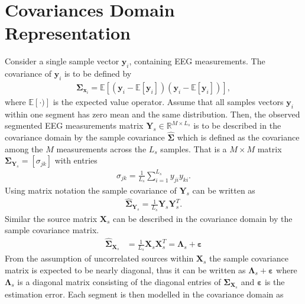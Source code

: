 \section{Covariances Domain Representation}\label{sec:cov}
Consider a single sample vector $\textbf{y}_i$, containing EEG measurements. 
The covariance of $\textbf{y}_i$ is to be defined by
\begin{align*}
\boldsymbol{\Sigma}_{\textbf{x}_i}=\mathbb{E}[(\textbf{y}_i-\mathbb{E}[\textbf{y}_i])(\textbf{y}_i-\mathbb{E}[\textbf{y}_i])],
\end{align*}
where $\mathbb{E}[\cdot)]$ is the expected value operator. 
Assume that all samples vectors $\textbf{y}_i$ within one segment has zero mean and the same distribution. 
Then, the observed segmented EEG measurements matrix $\mathbf{Y}_s \in \mathbb{R}^{M \times L_s}$ is to be described in the covariance domain by the sample covariance $\widehat{\boldsymbol{\Sigma}}$ which is defined as the covariance among the $M$ measurements across the $L_s$ samples. That is a $M \times M$ matrix $\boldsymbol{\Sigma}_{\mathbf{Y}_s}=[\sigma_{jk}]$ with entries 
\begin{align*}
\sigma_{jk}= \frac{1}{L_s}\sum_{i=1}^{L_s} y_{ji} y_{ki}.
\end{align*}
Using matrix notation the sample covariance of $\mathbf{Y}_s$ can be written as
\begin{align*}
\widehat{\boldsymbol{\Sigma}}_{\mathbf{Y}_s} = \frac{1}{L_s} \mathbf{Y}_s \mathbf{Y}_s^T.
\end{align*}  
Similar the source matrix $\mathbf{X}_s$ can be described in the covariance domain by the sample covariance matrix.
\begin{align*}
\widehat{\boldsymbol{\Sigma}}_{\mathbf{X}_s} &= \frac{1}{L_s} \mathbf{X}_s \mathbf{X}_s^T = \boldsymbol{\Lambda}_s + \boldsymbol{\varepsilon} 
\end{align*}
From the assumption of uncorrelated sources within $\mathbf{X}_s$ the sample covariance matrix is expected to be nearly diagonal, thus it can be written as $\boldsymbol{\Lambda}_s + \boldsymbol{\varepsilon}$ where $\boldsymbol{\Lambda}_s$ is a diagonal matrix consisting of the diagonal entries of $\widehat{\boldsymbol{\Sigma}}_{\mathbf{X}_s}$ and $ \boldsymbol{\varepsilon}$ is the estimation error\cite{Balkan2015}.
Each segment is then modelled in the covariance domain as
